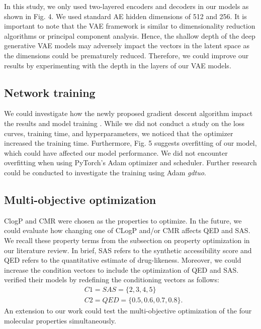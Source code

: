 In this study, we only used two-layered encoders and decoders in our models as shown in Fig. 4. We used standard AE hidden dimensions of 512 and 256. It is important to note that the VAE framework is similar to dimensionality reduction algorithms or principal component analysis. Hence, the shallow depth of the deep generative VAE models may adversely impact the vectors in the latent space as the dimensions could be prematurely reduced. Therefore, we could improve our results by experimenting with the depth in the layers of our VAE models. 

\subsection{Network training}
We could investigate how the newly proposed gradient descent algorithm impact the results and model training \cite{DBLP:journals/corr/abs-1909-13371}. While we did not conduct a study on the loss curves, training time, and hyperparameters, we noticed that the optimizer increased the training time. Furthermore, Fig. 5 suggests overfitting of our model, which could have affected our model performance. We did not encounter overfitting when using PyTorch's Adam optimizer and scheduler. Further research could be conducted to investigate the training using Adam \textit{gdtuo}.

\subsection{Multi-objective optimization}
ClogP and CMR were chosen as the properties to optimize. In the future, we could evaluate how changing one of CLogP and/or CMR affects QED and SAS. We recall these property terms from the subsection on property optimization in our literature review. In brief, SAS refers to the synthetic accessibility score and QED refers to the quantitative estimate of drug-likeness. Moreover, we could increase the condition vectors to include the optimization of QED and SAS. \cite{lee2022mgcvae} verified their models by redefining the conditioning vectors as follows:
\begin{equation}
    \begin{aligned}
    & C1 = SAS = \{2, 3, 4, 5\}\\
    & C2 = QED  =\{0.5, 0.6, 0.7, 0.8\}. \label{eq}
    \end{aligned}
\end{equation}
 An extension to our work could test the multi-objective optimization of the four molecular properties simultaneously. 

